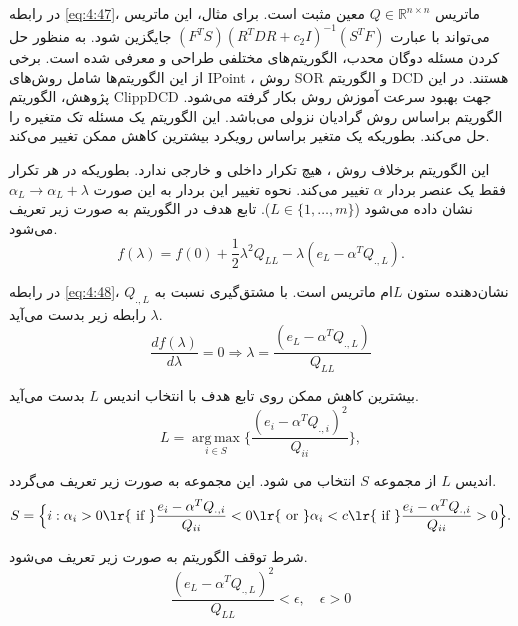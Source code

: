 در رابطه \ref{eq:4:47}، ماتریس  $Q \in \mathbb{R}^{n \times n}$ معین مثبت است.  برای مثال، این ماتریس می‌تواند با عبارت    $(F^{T}S){(R^{T}DR+ c_{2}I)^{-1}}{({S}^{T}F)}$ جایگزین شود.
به منظور حل کردن مسئله دوگان محدب، الگوریتم‌های مختلفی طراحی و معرفی شده است. برخی از این الگوریتم‌ها شامل روش‌های \gls{IPoint}  \cite{sra2012}، روش \gls{SOR} \cite{mang1999} و  الگوریتم \gls{DCD} \cite{hsieh2008} هستند. در این پژوهش، الگوریتم \gls{ClippDCD} \cite{peng2014} جهت بهبود سرعت آموزش روش  بکار گرفته می‌شود. الگوریتم  براساس روش گرادیان نزولی می‌باشد. این الگوریتم یک مسئله تک متغیره را حل می‌کند. بطوریکه یک متغیر براساس رویکرد بیشترین کاهش ممکن تغییر می‌کند.

این الگوریتم برخلاف روش ، هیچ تکرار داخلی و خارجی  ندارد. بطوریکه در هر تکرار فقط یک عنصر بردار $\alpha$  تغییر می‌کند. نحوه تغییر این بردار به این صورت $\alpha_{L} \rightarrow \alpha_{L} + \lambda$  نشان داده می‌شود ($L \in \{1,\dots,m\}$). تابع هدف در الگوریتم  به صورت زیر تعریف می‌شود.  
\begin{equation}\label{eq:4:48}
f(\lambda)=f(0) + \frac{1}{2}\lambda^{2}Q_{LL} - \lambda(e_{L} - \alpha^{T}Q_{.,L}).
\end{equation}

در رابطه \ref{eq:4:48}، $Q_{.,L}$  نشان‌دهنده ستون $L$ام ماتریس است. با مشتق‌گیری نسبت به $\lambda$ رابطه زیر بدست می‌آید.
\begin{equation}\label{eq:4:49}
\frac{df(\lambda)}{d\lambda}=0 \Rightarrow \lambda = \frac{(e_{L} - \alpha^{T}Q_{.,L})}{Q_{LL}}
\end{equation}

بیشترین کاهش ممکن روی تابع هدف با انتخاب اندیس $L$ بدست می‌آید.
\begin{equation}\label{eq:4:50}
L = \mathop{arg\,max}\limits_{i \in S}\Big\{\frac{(e_{i} - \alpha^{T}Q_{.,i})^{2}}{Q_{ii}}{} \Big\},
\end{equation}

اندیس  $L$ از مجموعه $S$ انتخاب می شود. این مجموعه به صورت زیر تعریف می‌گردد.
\begin{equation}\label{eq:4:51}
S =\Big\{i:\alpha_{i} > 0 \textrm{\lr{ if }} \frac{e_{i} - \alpha^{T}Q_{.,i}}{Q_{ii}} < 0 \\ \textrm{\lr{ or }}\alpha_{i} < c \textrm{\lr{ if }} \frac{e_{i} - \alpha^{T}Q_{.,i}}{Q_{ii}} > 0 \Big\}.
\end{equation}

شرط توقف الگوریتم  به صورت زیر تعریف می‌شود.
\begin{equation}\label{eq:4:52}
\frac{(e_{L} - \alpha^{T}Q_{.,L})^{2}}{Q_{LL}} < \epsilon, \quad \epsilon > 0
\end{equation}


